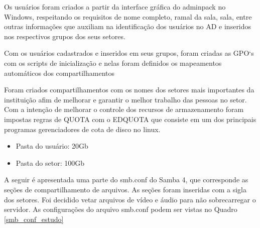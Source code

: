 Os usuários foram criados a partir da interface gráfica do adminpack no Windows, respeitando os requisitos de nome completo, ramal da sala, sala, entre outras informações que auxiliam na identificação dos usuários no AD e inseridos nos respectivos grupos dos seus setores.

Com os usuários cadastrados e inseridos em seus grupos, foram criadas as GPO`s com os scripts de inicialização e nelas foram definidos os mapeamentos automáticos dos compartilhamentos

Foram criados compartilhamentos com os nomes dos setores mais importantes da instituição afim de melhorar e garantir o melhor trabalho das pessoas no setor. Com a intenção de melhorar o controle dos recursos de armazenamento foram impostas regras de QUOTA com o EDQUOTA que consiste em um dos principais programas gerenciadores de cota de disco no linux.

\begin{itemize}
		\item {Pasta do usuário: 20Gb}
		\item {Pasta do setor: 100Gb}
\end{itemize}

A seguir é apresentada uma parte do smb.conf do Samba 4, que corresponde as seções de compartilhamento de arquivos. As seções foram inseridas com a sigla dos setores. Foi decidido vetar arquivos de vídeo e áudio para não sobrecarregar o servidor. As configurações do arquivo smb.conf podem ser vistas no Quadro \ref{smb_conf_estudo}\\

